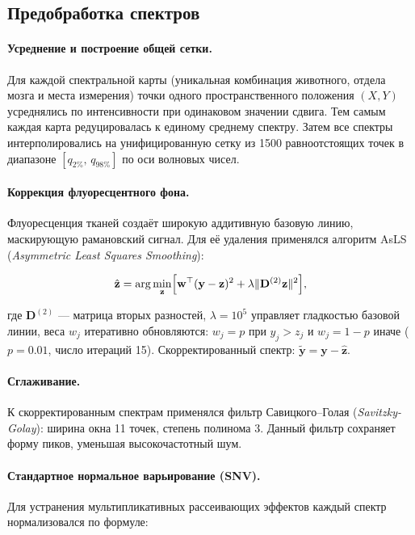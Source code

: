 \documentclass[12pt, a4paper]{article}
\begin{document}
\subsection{Предобработка спектров}

\paragraph{Усреднение и построение общей сетки.}
Для каждой спектральной карты (уникальная комбинация животного,
отдела мозга и места измерения) точки одного пространственного
положения $(X, Y)$ усреднялись по интенсивности при одинаковом
значении сдвига. Тем самым каждая карта редуцировалась к единому
среднему спектру. Затем все спектры интерполировались на
унифицированную сетку из 1500 равноотстоящих точек в диапазоне
$[q_{2\%},\, q_{98\%}]$ по оси волновых чисел.

\paragraph{Коррекция флуоресцентного фона.}
Флуоресценция тканей создаёт широкую аддитивную базовую линию,
маскирующую рамановский сигнал. Для её удаления применялся
алгоритм AsLS (\textit{Asymmetric Least Squares Smoothing}):

\begin{equation}
  \hat{\mathbf{z}} = \arg\min_{\mathbf{z}}
    \Bigl[
      \mathbf{w}^\top (\mathbf{y} - \mathbf{z})^2
      + \lambda \|\mathbf{D}^{(2)}\mathbf{z}\|^2
    \Bigr],
  \label{eq:als}
\end{equation}

где $\mathbf{D}^{(2)}$ — матрица вторых разностей,
$\lambda = 10^5$ управляет гладкостью базовой линии,
веса $w_j$ итеративно обновляются: $w_j = p$ при $y_j > z_j$ и
$w_j = 1-p$ иначе ($p = 0.01$, число итераций 15).
Скорректированный спектр: $\tilde{\mathbf{y}} = \mathbf{y} - \hat{\mathbf{z}}$.

\paragraph{Сглаживание.}
К скорректированным спектрам применялся фильтр
Савицкого–Голая (\textit{Savitzky-Golay}): ширина окна 11 точек,
степень полинома 3. Данный фильтр сохраняет форму пиков,
уменьшая высокочастотный шум.

\paragraph{Стандартное нормальное варьирование (SNV).}
Для устранения мультипликативных рассеивающих эффектов
каждый спектр нормализовался по формуле:
\end{document}
